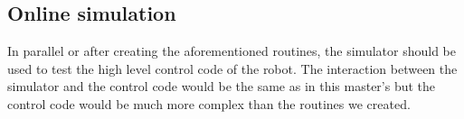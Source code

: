 \subsection{Online simulation}
In parallel or after creating the aforementioned routines, the simulator should be used to test the high level control code of the robot. The interaction between the simulator and the control code would be the same as in this master's but the control code would be much more complex than the routines we created.

